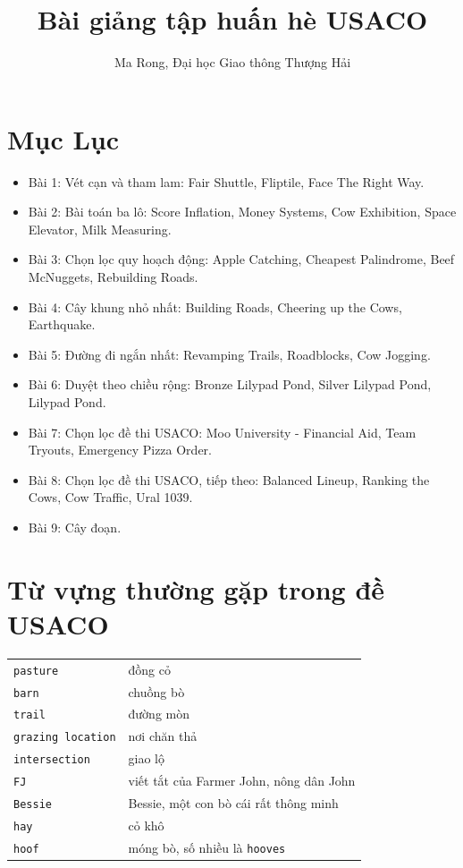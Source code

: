 \documentclass[11pt]{article}
\title{Bài giảng tập huấn hè USACO}
\author{Ma Rong, Đại học Giao thông Thượng Hải}
\date{}
\begin{document}
\maketitle


\section*{Mục Lục}

\begin{itemize}
  \item Bài 1: Vét cạn và tham lam: Fair Shuttle, Fliptile, Face The Right Way.
  \item Bài 2: Bài toán ba lô: Score Inflation, Money Systems, Cow Exhibition, Space Elevator, Milk Measuring.
  \item Bài 3: Chọn lọc quy hoạch động: Apple Catching, Cheapest Palindrome, Beef McNuggets, Rebuilding Roads.
  \item Bài 4: Cây khung nhỏ nhất: Building Roads, Cheering up the Cows, Earthquake.
  \item Bài 5: Đường đi ngắn nhất: Revamping Trails, Roadblocks, Cow Jogging.
  \item Bài 6: Duyệt theo chiều rộng: Bronze Lilypad Pond, Silver Lilypad Pond, Lilypad Pond.
  \item Bài 7: Chọn lọc đề thi USACO: Moo University - Financial Aid, Team Tryouts, Emergency Pizza Order.
  \item Bài 8: Chọn lọc đề thi USACO, tiếp theo: Balanced Lineup, Ranking the Cows, Cow Traffic, Ural 1039.
  \item Bài 9: Cây đoạn.
\end{itemize}

\section*{Từ vựng thường gặp trong đề USACO}

\begin{center}
\begin{tabular}{ll}
\texttt{pasture} & đồng cỏ \\
\texttt{barn} & chuồng bò \\
\texttt{trail} & đường mòn \\
\texttt{grazing location} & nơi chăn thả \\
\texttt{intersection} & giao lộ \\
\texttt{FJ} & viết tắt của Farmer John, nông dân John \\
\texttt{Bessie} & Bessie, một con bò cái rất thông minh \\
\texttt{hay} & cỏ khô \\
\texttt{hoof} & móng bò, số nhiều là \texttt{hooves}
\end{tabular}
\end{center}
\end{document}
